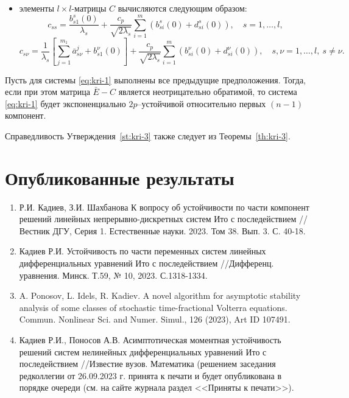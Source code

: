 \begin{itemize}
    \item элементы $l\times l$-матрицы $C$ вычисляются следующим образом:
    \begin{equation*}
    c_{ss} = \frac{b^s_{s1}(0)}{\lambda _s }  +
    \frac{c_p}{\sqrt{2\lambda_s }} \sum\limits_{i=1}^{m} (b^s_{si}(0) +
    d^s_{si} (0)), \quad  s = 1,\dots,l,
    \end{equation*}
    \begin{equation*}
    c_{s\nu} = \frac{1}{\lambda _s } \left [\sum\limits_{j =1}^{m_1}
    \bar a^{j}_{s\nu} + b^\nu_{s1}(0)\right ] +
    \frac{c_p}{\sqrt{2\lambda_s }} \sum\limits_{i=1}^{m} (b^\nu_{si}(0)
    +d^\nu_{si} (0)), \quad s,\nu = 1,\dots,l, \ s \neq \nu.
    \end{equation*}
\end{itemize}

\begin{statement}\label{st:kri-3}
    Пусть для системы \eqref{eq:kri-1} выполнены все
    предыдущие предположения. Тогда, если при этом матрица $\bar E - C$
    является неотрицательно обратимой, то система \eqref{eq:kri-1} будет
    экспоненциально $2p$--устойчивой относительно первых $(n-1)$
    компонент.
\end{statement}

Справедливость Утверждения~\ref{st:kri-3} также следует из Теоремы~\ref{th:kri-3}.


\section{Опубликованные результаты}

\begin{enumerate}
    \item  Р.И. Кадиев, З.И. Шахбанова К вопросу об устойчивости по части
    компонент решений линейных непрерывно-дискретных систем Ито с
    последействием // Вестник ДГУ, Серия 1. Естественные науки. 2023.
    Том 38. Вып. 3. С. 40-18.
    
    \item   Кадиев Р.И. Устойчивость по части переменных систем линейных
    дифференциальных уравнений Ито с последействием //Дифференц.
    уравнения. Минск. Т.59, № 10, 2023. С.1318-1334.
    
    \item  A. Ponosov, L. Idels, R. Kadiev. A novel algorithm for asymptotic
    stability analysis of some classes of stochastic time-fractional
    Volterra equations. Commun. Nonlinear Sci. and Numer. Simul., 126
    (2023), Art ID 107491.
    
    \item  Кадиев Р.И., Поносов А.В. Асимптотическая моментная устойчивость
    решений систем нелинейных дифференциальных уравнений Ито с
    последействием //Известие вузов. Математика (решением заседания
    редколлегии от 26.09.2023 г. принята к печати и будет опубликована в
    порядке очереди (см. на сайте журнала раздел <<Приняты к печати>>).
\end{enumerate}

